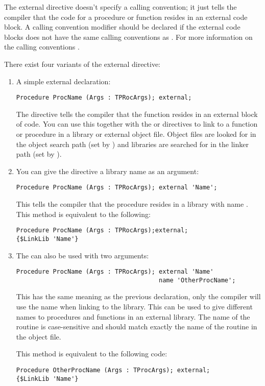 The external directive doesn't specify a calling convention; it just tells
the compiler that the code for a procedure or function resides in an
external code block. A calling convention modifier should be declared
if the external code blocks does not have the same calling conventions
as \fpc. For more information on the calling conventions
.

There exist four variants of the external directive:
\begin{enumerate}
\item A simple external declaration:
\begin{verbatim}
Procedure ProcName (Args : TPRocArgs); external;
\end{verbatim}
The  directive tells the compiler that the function resides in
an external block of code. You can use this together with the 
or  directives to link to a function or procedure in a
library or external object file. Object files are looked for in the object
search path (set by ) and libraries are searched for in the linker
path (set by ).

\item You can give the  directive a library name as an
argument:
\begin{verbatim}
Procedure ProcName (Args : TPRocArgs); external 'Name';
\end{verbatim}
This tells the compiler that the procedure resides in a library with name
. This method is equivalent to the following:
\begin{verbatim}
Procedure ProcName (Args : TPRocArgs);external;
{$LinkLib 'Name'}
\end{verbatim}
\item The  can also be used with two arguments:
\begin{verbatim}
Procedure ProcName (Args : TPRocArgs); external 'Name'
                                       name 'OtherProcName';
\end{verbatim}
This has the same meaning as the previous declaration, only the compiler
will use the name  when linking to the library. This
can be used to give different names to procedures and functions in an
external library. The name of the routine is case-sensitive and should
match exactly the name of the routine in the object file.

This method is equivalent to the following code:
\begin{verbatim}
Procedure OtherProcName (Args : TProcArgs); external;
{$LinkLib 'Name'}


\end{verbatim}
\end{enumerate}
